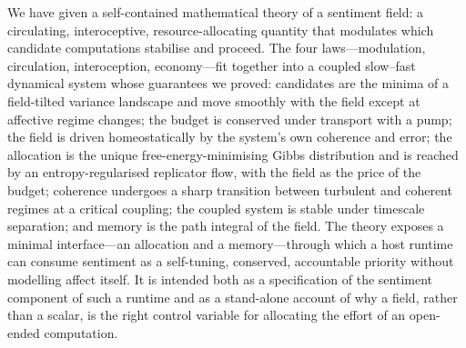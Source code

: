 \documentclass[11pt,a4paper]{article}
\theoremstyle{plain}
\theoremstyle{definition}
\theoremstyle{remark}
\begin{document}
We have given a self-contained mathematical theory of a sentiment field: a
circulating, interoceptive, resource-allocating quantity that modulates which
candidate computations stabilise and proceed. The four laws---modulation,
circulation, interoception, economy---fit together into a coupled slow--fast
dynamical system whose guarantees we proved: candidates are the minima of a
field-tilted variance landscape and move smoothly with the field except at
affective regime changes; the budget is conserved under transport with a pump;
the field is driven homeostatically by the system's own coherence and error;
the allocation is the unique free-energy-minimising Gibbs distribution and is
reached by an entropy-regularised replicator flow, with the field as the price
of the budget; coherence undergoes a sharp transition between turbulent and
coherent regimes at a critical coupling; the coupled system is stable under
timescale separation; and memory is the path integral of the field. The theory
exposes a minimal interface---an allocation and a memory---through which a host
runtime can consume sentiment as a self-tuning, conserved, accountable priority
without modelling affect itself. It is intended both as a specification of the
sentiment component of such a runtime and as a stand-alone account of why a
field, rather than a scalar, is the right control variable for allocating the
effort of an open-ended computation.



\end{document}
